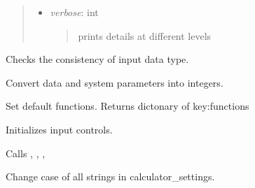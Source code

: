 \documentclass[letterpaper,10pt,english]{sphinxmanual}
\begin{document}
\begin{fulllineitems}
\begin{quote}
\begin{description}
\begin{itemize}
\item {} 
\emph{verbose}: int
\begin{quote}

prints details at different levels
\end{quote}

\end{itemize}

\end{description}\end{quote}

\begin{fulllineitems}
\label{classes:catcontrols.CATControls.check_input}
Checks the consistency of input data type.

\end{fulllineitems}


\begin{fulllineitems}
\label{classes:catcontrols.CATControls.convert_params}
Convert data and system parameters into integers.

\end{fulllineitems}


\begin{fulllineitems}
\label{classes:catcontrols.CATControls.gen_functions}
Set default functions. Returns dictonary of key:functions

\end{fulllineitems}


\begin{fulllineitems}
\label{classes:catcontrols.CATControls.initialize}
Initializes input controls.

Calls {\hyperref[classes:catcontrols.CATControls.check_input]{}}, {\hyperref[classes:catcontrols.CATControls.make_lower]{}}, ,
{\hyperref[classes:catcontrols.CATControls.convert_params]{}}

\end{fulllineitems}


\begin{fulllineitems}
\label{classes:catcontrols.CATControls.make_lower}
Change case of all strings in calculator\_settings.

\end{fulllineitems}


\end{fulllineitems}
\end{document}
